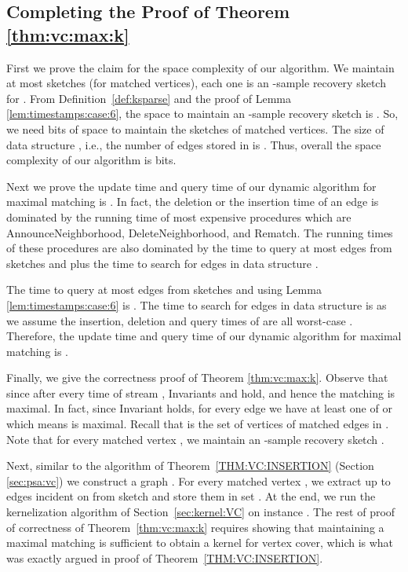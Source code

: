 \documentclass[11pt,letter]{article}
\begin{document}
\subsection{Completing the Proof of Theorem \ref{thm:vc:max:k}}

First we prove the claim for the space complexity of our algorithm.
We maintain at most  sketches (for matched vertices), each one is
an -sample recovery sketch for .
From Definition~\ref{def:ksparse} and the proof of Lemma
\ref{lem:timestamps:case:6}, the space to maintain an
-sample recovery sketch is . So, we need
 bits of space to maintain the sketches of matched vertices.
The size of data structure , i.e.,
the number of edges stored in  is .
Thus, overall the space complexity of our algorithm is  bits.

Next we prove the update time and query time of our dynamic algorithm
for maximal matching is . In fact, the deletion or the insertion
time of an edge  is dominated by the running time of most expensive
procedures which are {\sf AnnounceNeighborhood}, {\sf DeleteNeighborhood},
and {\sf Rematch}. The running times of these procedures are also
dominated by the time to query at most  edges from sketches  and  plus
the time to search for  edges in data structure .

The time to query at most  edges from sketches  and  using
Lemma \ref{lem:timestamps:case:6} is . The time to search
for  edges in data structure  is  as we assume
the insertion, deletion and query times of  are all worst-case .
Therefore, the update time and query time of our dynamic algorithm
for maximal matching is .

Finally, we give the correctness proof of Theorem \ref{thm:vc:max:k}.
Observe that since after every time  of stream , Invariants  and  hold, and hence the matching 
is maximal. In fact, since Invariant  holds,  for every edge 
we have at least one of  or 
which means  is maximal.
Recall that  is the set of vertices of matched edges in .
Note that for every matched vertex ,
we maintain an -sample recovery sketch .

Next, similar to the algorithm of Theorem~\ref{THM:VC:INSERTION} (Section \ref{sec:psa:vc}) we construct a graph .
For every matched vertex , we extract up to  edges incident on  from
sketch  and store them in set . At the end,
we run the kernelization algorithm of Section~\ref{sec:kernel:VC}
on instance . The rest of proof of correctness of
Theorem~\ref{thm:vc:max:k} requires showing that maintaining a maximal
matching is sufficient to obtain a kernel for vertex cover, which is what was exactly argued in proof of Theorem~\ref{THM:VC:INSERTION}.
\end{document}

